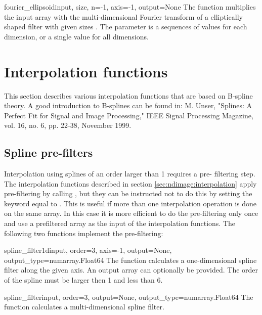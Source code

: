 \begin{funcdesc}{fourier_ellipsoid}{input, size, n=-1, axis=-1, 
  output=None}
  The  function multiplies the input array with 
  the multi-dimensional Fourier transform of a elliptically shaped filter 
  with given sizes . The  parameter is a sequences of 
  values for each dimension, or a single value for all dimensions.  
\end{funcdesc}

\section{Interpolation functions}
This section describes various interpolation functions that are based on
B-spline theory. A good introduction to B-splines can be found in: M. 
Unser, "Splines: A Perfect Fit for Signal and Image Processing," IEEE 
Signal Processing Magazine, vol. 16, no. 6, pp. 22-38, November 1999.
\subsection{Spline pre-filters}
Interpolation using splines of an order larger than 1 requires a pre-
filtering step. The interpolation functions described in section
\ref{sec:ndimage:interpolation} apply pre-filtering by calling
, but they can be instructed not to do this by 
setting the  keyword equal to .  This is 
useful if more than one interpolation operation is done on the same array. 
In this case it is more efficient to do the pre-filtering only once and use 
a prefiltered array as the input of the interpolation functions. The 
following two functions implement the pre-filtering:

\begin{funcdesc}{spline_filter1d}{input, order=3, axis=-1, output=None,
    output_type=numarray.Float64} The  function
  calculates a one-dimensional spline filter along the given axis. An 
  output array can optionally be provided. The order of the spline must be 
  larger then 1 and less than 6.
\end{funcdesc}

\begin{funcdesc}{spline_filter}{input, order=3, output=None, 
    output_type=numarray.Float64} The  function
  calculates a multi-dimensional spline filter.
  
\end{funcdesc}

